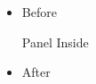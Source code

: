 \documentclass{beamer}
\date{}
\begin{document}
\begin{frame}[t]
\begin{itemize}
\item Before
\begin{block}{Panel}
Inside
\end{block}
\item After
\end{itemize}
\end{frame}
\end{document}
